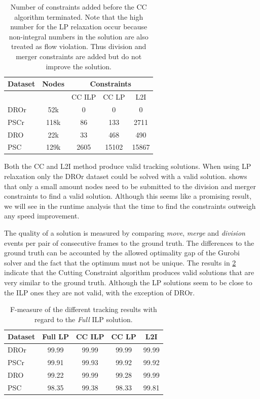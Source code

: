 \documentclass[10pt,twocolumn,letterpaper]{article}
\begin{document}
\begin{table}
  \begin{center}
  \begin{tabular}{|l|c||c|c|c|}
    \hline
    Dataset & Nodes & \multicolumn{3}{|c|}{Constraints}\\
    \hline\hline
            &       & CC ILP & CC LP & L2I\\
    \hline
    DROr & 52k & 0 & 0 & 0\\
    PSCr & 118k & 86 & 133 & 2711\\
    DRO & 22k & 33 & 468 & 490\\
    PSC & 129k & 2605 & 15102 & 15867\\
    \hline
  \end{tabular}
  \end{center}
  \caption{Number of constraints added before the CC algorithm terminated. Note that the high number for the LP relaxation occur because non-integral numbers in the solution are also treated as flow violation. Thus division and merger constraints are added but do not improve the solution.}
  \label{tab:constraints}
\end{table}


Both the CC and L2I method produce valid tracking solutions. When using LP relaxation only the DROr dataset could be solved with a valid solution.  shows that only a small amount nodes need to be submitted to the division and merger constraints to find a valid solution. Although this seems like a promising result, we will see in the runtime analysis that the time to find the constraints outweigh any speed improvement.

The quality of a solution is measured by comparing \textit{move}, \textit{merge} and \textit{division} events per pair of consecutive frames to the ground truth. The differences to the ground truth can be accounted by the allowed optimality gap of the Gurobi solver and the fact that the optimum must not be unique. The results in \cref{tab:fmeasure} indicate that the Cutting Constraint algorithm produces valid solutions that are very similar to the ground truth. Although the LP solutions seem to be close to the ILP ones they are not valid, with the exception of DROr.

\begin{table}
  \begin{center}
  \begin{tabular}{|l||c|c|c|c|}
    \hline
    Dataset & Full LP & CC ILP & CC LP & L2I\\
    \hline\hline
    DROr & 99.99 & 99.99 & 99.99 & 99.99\\
    PSCr & 99.91 & 99.93 & 99.92 & 99.92\\
    DRO & 99.22 & 99.99 & 99.28 & 99.99 \\
    PSC & 98.35 & 99.38 & 98.33 & 99.81\\
    \hline
  \end{tabular}
  \end{center}
  \caption{F-measure of the different tracking results with regard to the \textit{Full} ILP solution.}
  \label{tab:fmeasure}
\end{table}
\end{document}
